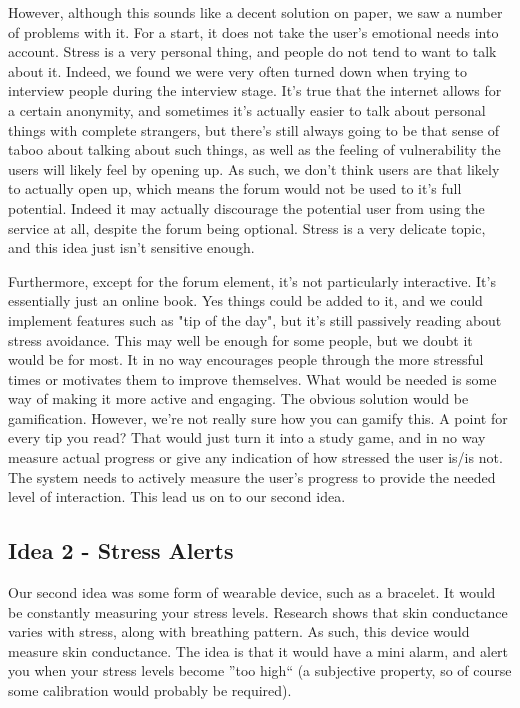 \documentclass{scrartcl}
\begin{document}
However, although this sounds like a decent solution on paper, we saw a number of problems with it.
For a start, it does not take the user's emotional needs into account. Stress is a very personal thing, and people do not
tend to want to talk about it. Indeed, we found we were very often turned down when trying to interview people during the
interview stage. It's true that the internet allows for a certain anonymity, and sometimes it's actually easier to talk
about personal things with complete strangers, but there's still always going to be that sense of taboo about talking about
such things, as well as the feeling of vulnerability the users will likely feel by opening up. As such, we don't think users
are that likely to actually open up, which means the forum would not be used to it's full potential. Indeed it may actually
discourage the potential user from using the service at all, despite the forum being optional. Stress is a very delicate
topic, and this idea just isn't sensitive enough.

Furthermore, except for the
forum element, it's not particularly interactive. It's essentially just an online book. Yes things could be added to it, and we
could implement features such as "tip of the day", but it's still passively reading about stress avoidance. This may well be
enough for some people, but we doubt it would be for most. It in no way encourages people through the more stressful times or
motivates them to improve themselves. What would be needed is some way of making it more active and engaging. The obvious
solution would be gamification. However, we're not really sure how you can gamify this. A point for every tip you read?
That would just turn it into a study game, and in no way measure actual progress or give any indication of how stressed the user
is/is not. The system needs to actively measure the user's progress to provide the needed level of interaction. This lead
us on to our second idea.

\subsection{Idea 2 - Stress Alerts}
Our second idea was some form of wearable device, such as a bracelet. It would be constantly measuring your stress levels.
Research shows that skin conductance varies with stress, along with breathing pattern. As such, this device would measure
skin conductance. The idea is that it would have a mini alarm, and alert you when your stress levels become ''too high``
(a subjective property, so of course some calibration would probably be required).
\end{document}
